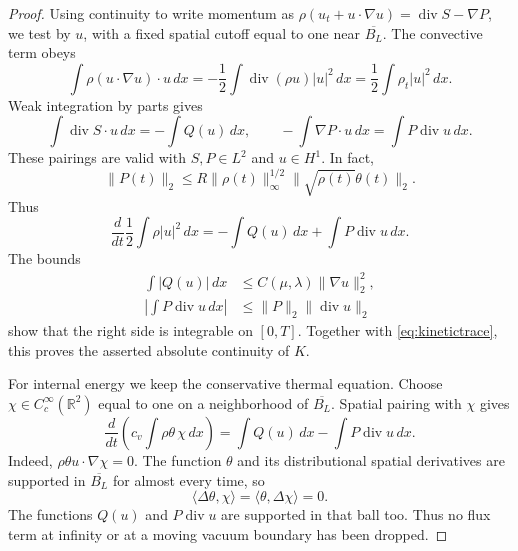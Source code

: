 \documentclass[10pt,twoside]{article}
\newcommand{\R}{\mathbb R}
\newcommand{\dd}{\,dx}
\newcommand{\Div}{\operatorname{div}}
\newcommand{\norm}[2]{\lVert#1\rVert_{#2}}
\begin{document}
\begin{proof}
Using continuity to write momentum as
$\rho(u_t+u\cdot\nabla u)=\Div S-\nabla P$, we test by $u$,
with a fixed spatial cutoff equal to one near $\overline{B_L}$.
The convective term obeys
\begin{equation}
 \int\rho(u\cdot\nabla u)\cdot u\dd
       =-\frac12\int\Div(\rho u)|u|^2\dd
       =\frac12\int\rho_t|u|^2\dd.
 \label{eq:kinetictransport}
\end{equation}
Weak integration by parts gives
\[
 \int\Div S\cdot u\dd=-\int Q(u)\dd,\qquad
 -\int\nabla P\cdot u\dd=\int P\Div u\dd.
\]
These pairings are valid with $S,P\in L^2$ and $u\in H^1$.
In fact,
\begin{equation}
 \norm{P(t)}{2}
       \le R\norm{\rho(t)}{\infty}^{1/2}
                    \norm{\sqrt{\rho(t)}\theta(t)}{2}.
 \label{eq:pressureLtwo}
\end{equation}
Thus
\begin{equation}
 \frac{d}{dt}\frac12\int\rho|u|^2\dd
       =-\int Q(u)\dd+\int P\Div u\dd.
 \label{eq:kineticbalance}
\end{equation}
The bounds
\begin{equation}
 \begin{aligned}
 \int|Q(u)|\dd&\le C(\mu,\lambda)\norm{\nabla u}{2}^2,\\
 \left|\int P\Div u\dd\right|
       &\le\norm{P}{2}\norm{\Div u}{2}
 \end{aligned}\label{eq:energyintegrability}
\end{equation}
show that the right side is integrable on $[0,T]$. Together with
\eqref{eq:kinetictrace}, this proves the asserted absolute
continuity of $K$.

For internal energy we keep the conservative thermal equation.
Choose $\chi\in C_c^\infty(\R^2)$ equal to one on a neighborhood
of $\overline{B_L}$. Spatial pairing with $\chi$ gives
\begin{equation}
 \frac{d}{dt}\left(c_v\int\rho\theta\,\chi\dd\right)
       =\int Q(u)\dd-\int P\Div u\dd.
 \label{eq:internalbalance}
\end{equation}
Indeed, $\rho\theta u\cdot\nabla\chi=0$. The function $\theta$
and its distributional spatial derivatives are supported in
$\overline{B_L}$ for almost every time, so
\[
 \langle\Delta\theta,\chi\rangle
       =\langle\theta,\Delta\chi\rangle=0.
\]
The functions $Q(u)$ and $P\Div u$ are supported in that ball too.
Thus no flux term at infinity or at a moving vacuum boundary has
been dropped.


\end{proof}
\end{document}
